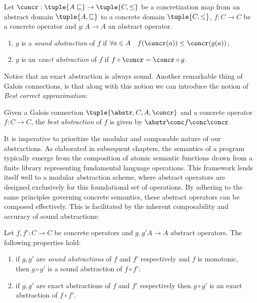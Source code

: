\begin{definition}
  Let \(\concr : \tuple{A \sqsubseteq} \to \tuple{C, \leq}\) be a
  concretization map from an abstract domain
  \(\tuple{A, \sqsubseteq}\) to a concrete domain \(\tuple{C, \leq}\),
  \(f : C \to C\) be a concrete operator and \(g : A \to A\) an
  abstract operator.
  \begin{enumerate}
  \item \(g\) is a \emph{sound abstraction} of \(f\) if
    \(\forall a \in A \quad f(\concr(a)) \leq \concr(g(a))\);
  \item \(g\) is an \emph{exact abstraction} of \(f\) if
    \(f \circ \concr = \concr \circ g\).
  \end{enumerate}
\end{definition}

Notice that an exact abstraction is always sound.  Another remarkable
thing of Galois connections, is that along with this notion we can
introduce the notion of \emph{Best correct approximation}:

\begin{definition}
  Given a Galois connection \(\tuple{\abstr, C, A, \concr}\) and a
  concrete operator \(f : C \to C\), the \emph{best abstraction} of
  \(f\) is given by \(\abstr \conc f \conc \concr\).
\end{definition}

It is imperative to prioritize the modular and composable nature of
our abstractions. As elaborated in subsequent chapters, the semantics
of a program typically emerge from the composition of atomic semantic
functions drawn from a finite library representing fundamental
language operations. This framework lends itself well to a modular
abstraction scheme, where abstract operators are designed exclusively
for this foundational set of operations. By adhering to the same
principles governing concrete semantics, these abstract operators can
be composed effectively. This is facilitated by the inherent
composability and accuracy of sound abstractions:

\begin{theorem}\label{th:opcomp}
  Let \(f, f' : C \to C\) be concrete operators and \(g, g' A \to A\)
  abstract operators. The following properties hold:
  \begin{enumerate}[label=(\arabic*)]
  \item if \(g, g'\) are \emph{sound abstractions} of \(f\) and \(f'\)
    respectively and \(f\) is monotonic, then \(g \circ g'\) is a
    sound abstraction of \(f \circ f'\);
  \item if \(g, g'\) are exact abstractions of \(f\) and \(f'\)
    respectively then \(g \circ g'\) is an exact abstraction of
    \(f \circ f'\).
  \end{enumerate}
\end{theorem}

